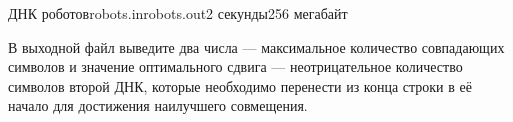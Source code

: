 \begin{problem}{ДНК роботов}{robots.in}{robots.out}{2 секунды}{256 мегабайт}
\OutputFile

В выходной файл выведите два числа --- максимальное количество
совпадающих символов и значение оптимального сдвига ---
неотрицательное количество символов второй ДНК, которые необходимо
перенести из конца строки в её начало для достижения наилучшего совмещения.

\Example

\begin{example}
%
\end{example}

\end{problem}
